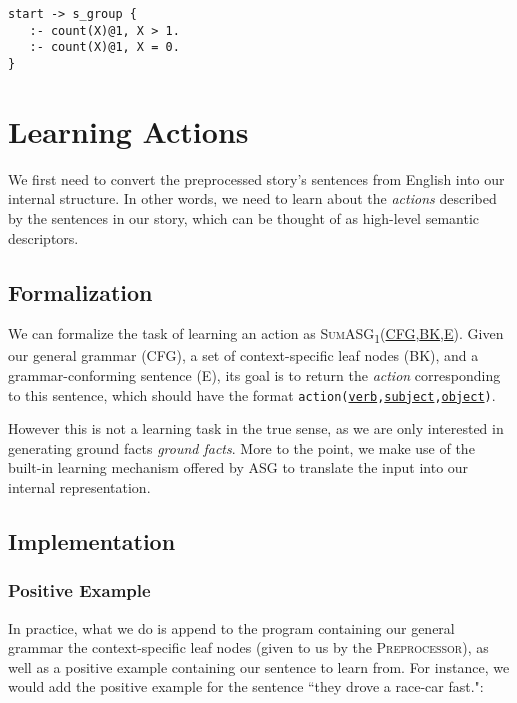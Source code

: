 \begin{displayquote}
\begin{lstlisting}
start -> s_group {
   :- count(X)@1, X > 1.
   :- count(X)@1, X = 0.
}
\end{lstlisting}
\end{displayquote}

\section{Learning Actions}
\label{sec:learn_actions}

We first need to convert the preprocessed story's sentences from English into our internal structure. In other words, we need to learn about the \textit{actions} described by the sentences in our story, which can be thought of as high-level semantic descriptors.

\subsection{Formalization}

We can formalize the task of learning an action as \textsc{SumASG\textsubscript{1}(\underline{CFG},\underline{BK},\underline{E})}. Given our general grammar (\textsc{CFG}), a set of context-specific leaf nodes (\textsc{BK}), and a grammar-conforming sentence (\textsc{E}), its goal is to return the \textit{action} corresponding to this sentence, which should have the format \texttt{action(\underline{verb},\underline{subject},\underline{object})}.

However this is not a learning task in the true sense, as we are only interested in generating ground facts \textit{ground facts}. More to the point, we make use of the built-in learning mechanism offered by ASG to translate the input into our internal representation.

\subsection{Implementation}

\subsubsection{Positive Example}

In practice, what we do is append to the program containing our general grammar the context-specific leaf nodes (given to us by the \textsc{Preprocessor}), as well as a positive example containing our sentence to learn from. For instance, we would add the positive example for the sentence ``they drove a race-car fast.":

